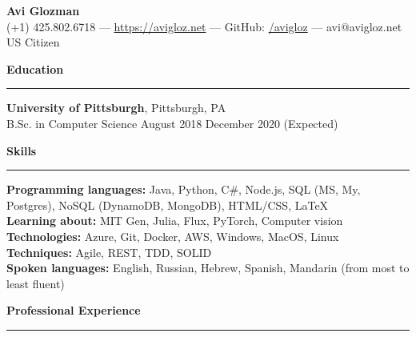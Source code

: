 \documentclass[11pt]{article}
\begin{document}
	\pagestyle{empty}
	\begin{center}
		{\LARGE \textbf{Avi Glozman}}\\
		\vspace{2mm}
		{\large (+1) 425.802.6718 --- \href{https://avigloz.net}{https://avigloz.net} --- GitHub: \href{https://github.com/avigloz}{/avigloz} --- avi@avigloz.net}\\
		\vspace{2mm}
		US Citizen
	\end{center}
	
	\vspace{-1mm}
	{\large \raggedright \textbf{Education}}
	\vspace{1.5mm}

	\hrule

	\vspace{-0.5mm}
	\begin{flushleft}
		\textbf{University of Pittsburgh}, Pittsburgh, PA\\
		B.Sc. in Computer Science \hfill August 2018 \textemdash December 2020 (Expected)
	\end{flushleft}

	\vspace{-1mm}
	{\large \raggedright \textbf{Skills}}
	\vspace{1.5mm}

	\hrule

	\vspace{-0.5mm}
	\begin{flushleft}
		\textbf{Programming languages:} Java, Python, C\#, Node.js, SQL (MS, My, Postgres), NoSQL (DynamoDB, MongoDB), HTML/CSS, \LaTeX\\
		\textbf{Learning about:} MIT Gen, Julia, Flux, PyTorch, Computer vision\\
		\textbf{Technologies:} Azure, Git, Docker, AWS, Windows, MacOS, Linux\\
		\textbf{Techniques:} Agile, REST, TDD, SOLID\\
		\textbf{Spoken languages:} English, Russian, Hebrew, Spanish, Mandarin (from most to least fluent)
	\end{flushleft}
	
	\vspace{-1mm}
	{\large \raggedright \textbf{Professional Experience}}
	\vspace{1.5mm}

	\hrule
\end{document}
